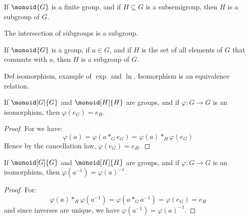 \documentclass{article}                                                        %
\begin{document}
            \begin{theorem}
                If $\monoid{G}$ is a finite group, and if $H\subseteq{G}$ is a
                subsemigroup, then $H$ is a subgroup of $G$.
            \end{theorem}
            \begin{theorem}
                The intersection of subgroups is a subgroup.
            \end{theorem}
            \begin{theorem}
                If $\monoid{G}$ is a group, if $a\in{G}$, and if $H$ is the set
                of all elements of $G$ that commute with $a$, then $H$ is a
                subgroup of $G$.
            \end{theorem}
            Def isomorphism, example of $\exp$ and $\ln$. Isomorphism is an
            equivalence relation.
            \begin{theorem}
                If $\monoid[G]{G}$ and $\monoid[H]{H}$ are groups, and if
                $\varphi:G\rightarrow{G}$ is an isomorphism, then
                $\varphi(e_{G})=e_{H}$.
            \end{theorem}
            \begin{proof}
                For we have:
                \begin{equation}
                    \varphi(a)=\varphi(a*_{G}e_{G})
                              =\varphi(a)*_{H}\varphi(e_{G})
                \end{equation}
                Hence by the cancellation law, $\varphi(e_{G})=e_{H}$.
            \end{proof}
            \begin{theorem}
                If $\monoid[G]{G}$ and $\monoid[H]{H}$ are groups, and if
                $\varphi:G\rightarrow{G}$ is an isomorphism, then
                $\varphi(a^{\minus{1}})=\varphi(a)^{\minus{1}}$.
            \end{theorem}
            \begin{proof}
                For:
                \begin{equation}
                    \varphi(a)*_{H}\varphi(a^{\minus{1}})
                        =\varphi(a*_{G}a^{\minus{1}})
                        =\varphi(e_{G})
                        =e_{H}
                \end{equation}
                and since inverses are unique, we have
                $\varphi(a^{\minus{1}})=\varphi(a)^{\minus{1}}$.
            \end{proof}
\end{document}
